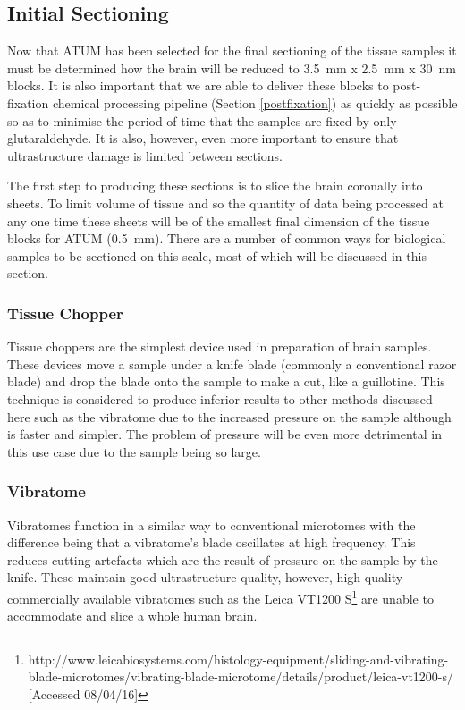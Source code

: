 \documentclass[a4paper, 11pt]{article}
\numberwithin{equation}{section}
\begin{document}
	\subsection{Initial Sectioning}
	\label{sectioning_small}
	
	Now that ATUM has been selected for the final sectioning of the tissue samples it must be determined how the brain will be reduced to \SI{3.5}{\milli\meter} x \SI{2.5}{\milli\meter} x \SI{30}{\nano\meter} blocks. It is also important that we are able to deliver these blocks to post-fixation chemical processing pipeline (Section \ref{postfixation}) as quickly as possible so as to minimise the period of time that the samples are fixed by only glutaraldehyde. It is also, however, even more important to ensure that ultrastructure damage is limited between sections.
	
	The first step to producing these sections is to slice the brain coronally into sheets. To limit volume of tissue and so the quantity of data being processed at any one time these sheets will be of the smallest final dimension of the tissue blocks for ATUM (\SI{0.5}{\milli\meter}). There are a number of common ways for biological samples to be sectioned on this scale, most of which will be discussed in this section.
	
	\subsubsection{Tissue Chopper}
	\label{sectioning_small_tissuechopper}
	
	Tissue choppers are the simplest device used in preparation of brain samples. These devices move a sample under a knife blade (commonly a conventional razor blade) and drop the blade onto the sample to make a cut, like a guillotine. This technique is considered to produce inferior results to other methods discussed here such as the vibratome due to the increased pressure on the sample \cite{walz2002patch} although is faster and simpler. The problem of pressure will be even more detrimental in this use case due to the sample being so large.
	
	\subsubsection{Vibratome}
	\label{sectioning_small_vibratome}
	
	Vibratomes function in a similar way to conventional microtomes with the difference being that a vibratome's blade oscillates at high frequency. This reduces cutting artefacts which are the result of pressure on the sample by the knife. These maintain good ultrastructure quality, however, high quality commercially available vibratomes such as the Leica VT1200 S\footnote{http://www.leicabiosystems.com/histology-equipment/sliding-and-vibrating-blade-microtomes/vibrating-blade-microtome/details/product/leica-vt1200-s/ [Accessed 08/04/16]} are unable to accommodate and slice a whole human brain. 
	
\end{document}
